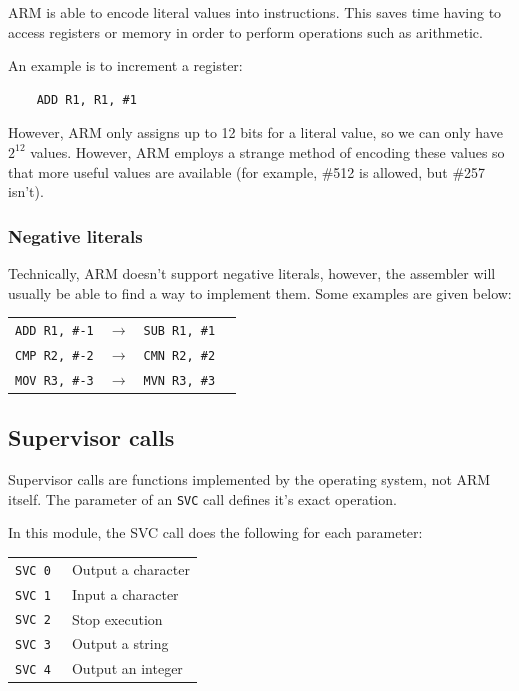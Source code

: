 ARM is able to encode literal values into instructions. This saves time having to access registers or memory in order to perform operations such as arithmetic.

An example is to increment a register:

\begin{verbatim}
	ADD	R1, R1, #1
\end{verbatim}

However, ARM only assigns up to 12 bits for a literal value, so we can only have $2^{12}$ values. However, ARM employs a strange method of encoding these values so that more useful values are available (for example, \#512 is allowed, but \#257 isn't).

\subsubsection{Negative literals}

Technically, ARM doesn't support negative literals, however, the assembler will usually be able to find a way to implement them. Some examples are given below:

\begin{center}
    \begin{tabular}{l l l r}
        {\tt ADD R1, \#-1} & $\rightarrow$ & {\tt SUB R1, \#1}\\
        {\tt CMP R2, \#-2} & $\rightarrow$ & {\tt CMN R2, \#2}\\
        {\tt MOV R3, \#-3} & $\rightarrow$ & {\tt MVN R3, \#3}\\
    \end{tabular}
\end{center}

\subsection{Supervisor calls}

Supervisor calls are functions implemented by the operating system, not ARM itself. The parameter of an {\tt SVC} call defines it's exact operation.

In this module, the SVC call does the following for each parameter:

\begin{tabularx}{\textwidth}{l X}
	{\tt SVC 0 } & Output a character \\
	{\tt SVC 1 } & Input a character \\
	{\tt SVC 2 } & Stop execution \\
	{\tt SVC 3 } & Output a string \\
	{\tt SVC 4 } & Output an integer \\
\end{tabularx}

